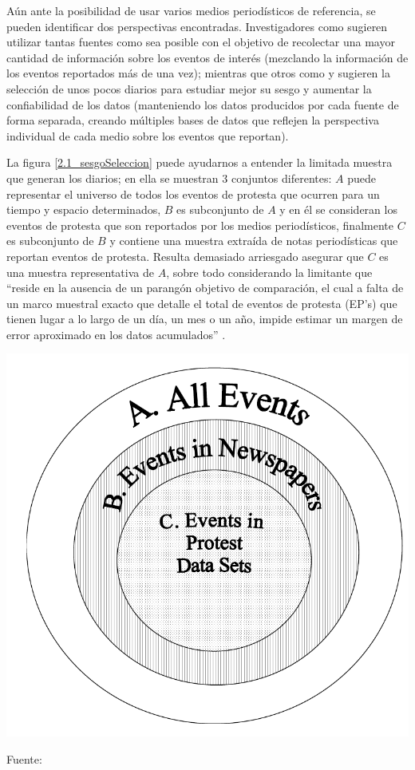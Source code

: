 \documentclass[letterpaper, 11pt]{book}
\theoremstyle{definition}
\theoremstyle{remark}
\begin{document}
Aún ante la posibilidad de usar varios medios periodísticos de referencia, se pueden identificar dos perspectivas encontradas.
Investigadores como \citet{2002_Koopmans_AEP} sugieren utilizar tantas fuentes como sea posible con el objetivo de recolectar una mayor cantidad de información sobre los eventos de interés (mezclando la información de los eventos reportados más de una vez); mientras que otros como \citet{2003_Wada_Tesis} y \citet{2010_Franzosi_QNA} sugieren la selección de unos pocos diarios para estudiar mejor su sesgo y aumentar la confiabilidad de los datos (manteniendo los datos producidos por cada fuente de forma separada, creando múltiples bases de datos que reflejen la perspectiva individual de cada medio sobre los eventos que reportan).


La figura \ref{2.1_sesgoSeleccion} puede ayudarnos a entender la limitada muestra que generan los diarios; en ella se muestran 3 conjuntos diferentes: $A$ puede representar el universo de todos los eventos de protesta que ocurren para un tiempo y espacio determinados, $B$ es subconjunto de $A$ y en él se consideran los eventos de protesta que son reportados por los medios periodísticos, finalmente $C$ es subconjunto de $B$ y contiene una muestra extraída de notas periodísticas que reportan eventos de protesta. 
Resulta demasiado arriesgado asegurar que $C$ es una muestra representativa de $A$, sobre todo considerando la limitante que ``reside en la ausencia de un parangón objetivo de comparación, el cual a falta de un marco muestral exacto que detalle el total de eventos de protesta (EP’s) que tienen lugar a lo largo de un día, un mes o un año, impide estimar un margen de error aproximado en los datos acumulados'' \citep[2]{2017_Urbina_estudiantes}. 

\begin{minipage}{\linewidth}
\centering
{} \label{2.1_sesgoSeleccion}
\includegraphics[scale=0.16]{img/2.1_sesgoSeleccion.png}
\par\bigskip
\small Fuente: \citep[6]{2005_Ortiz_NewspaperData}
\end{minipage}\bigskip
\end{document}
